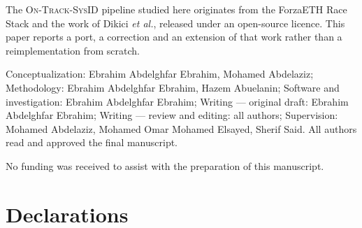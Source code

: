 \documentclass[12pt]{sn-jnl}
\begin{document}

\maketitle
\backmatter

The \textsc{On-Track-SysID} pipeline studied here originates from the ForzaETH
Race Stack and the work of Dikici \emph{et al.}, released under an open-source
licence. This paper reports a port, a correction and an extension of that work
rather than a reimplementation from scratch.

Conceptualization: Ebrahim Abdelghfar Ebrahim, Mohamed Abdelaziz;
Methodology: Ebrahim Abdelghfar Ebrahim, Hazem Abuelanin;
Software and investigation: Ebrahim Abdelghfar Ebrahim;
Writing --- original draft: Ebrahim Abdelghfar Ebrahim;
Writing --- review and editing: all authors;
Supervision: Mohamed Abdelaziz, Mohamed Omar Mohamed Elsayed, Sherif Said.
All authors read and approved the final manuscript.

No funding was received to assist with the preparation of this manuscript.

\section*{Declarations}
\end{document}
